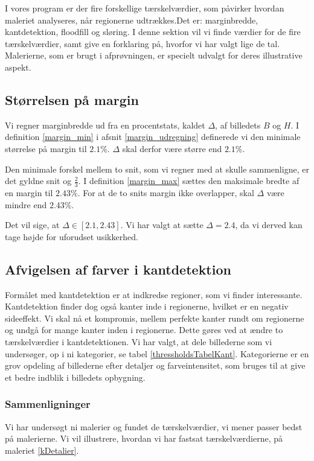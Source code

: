 {\sffamily
I vores program er der fire forskellige tærskelværdier, som påvirker
hvordan maleriet analyseres, når regionerne udtrækkes.Det er:
marginbredde, kantdetektion, floodfill og sløring. I denne sektion vil
vi finde værdier for de fire tærskelværdier, samt give en forklaring på, hvorfor vi
har valgt lige de tal. Malerierne, som er brugt i afprøvningen, er specielt
udvalgt for deres illustrative aspekt. 
}

\subsection{Størrelsen på margin}
Vi regner marginbredde ud fra en procentstats, kaldet $\Delta$, af
billedets $B$ og $H$. I definition \ref{margin_min} i afsnit \ref{margin_udregning} definerede vi den
minimale størrelse på margin til $2.1 \%$. $\Delta$ skal derfor være større end $2.1 \%$. 

Den minimale forskel mellem to snit, som vi regner med at skulle sammenligne, er
det gyldne snit og $\frac{2}{3}$. I definition \ref{margin_max} sættes den
maksimale bredte af en margin til $2.43\%$. For at de to snits margin ikke
overlapper, skal $\Delta$ være mindre end $2.43\%$. 

Det vil sige, at $\Delta \in [2.1, 2.43]$. Vi har valgt at
sætte $\Delta = 2.4$, da vi derved kan tage højde for uforudset
usikkerhed.

\subsection{Afvigelsen af farver i kantdetektion}
Formålet med kantdetektion er at indkredse regioner, som vi finder
interessante. Kantdetektion finder dog også kanter inde i regionerne,
hvilket er en negativ sideeffekt. Vi skal nå et kompromis, mellem 
perfekte kanter rundt om regionerne og undgå for mange kanter inden i regionerne.
Dette gøres ved at ændre to tærskelværdier
i kantdetektionen. Vi har valgt, at dele billederne som vi undersøger, op
i ni kategorier, se tabel \ref{thressholdsTabelKant}. Kategorierne er en
grov opdeling af billederne efter detaljer og farveintensitet, som
bruges til at give et bedre indblik i billedets opbygning.

\subsubsection{Sammenligninger}
Vi har undersøgt ni malerier og fundet de tærskelværdier, vi mener
passer bedst på malerierne. Vi vil illustrere, hvordan vi har fastsat
tærskelværdierne, på maleriet \ref{kDetalier}.

